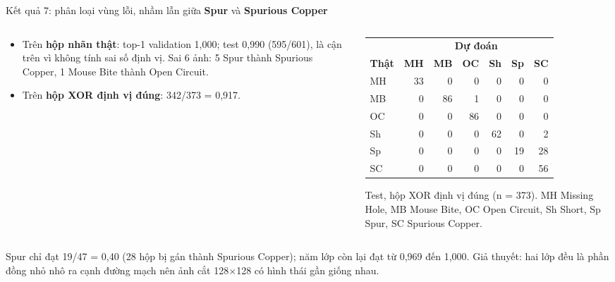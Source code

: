 \documentclass[aspectratio=169,11pt,t]{beamer}
\newcommand{\hl}[1]{{\bfseries\color{coral}#1}}
\newcommand{\hdr}[1]{{\bfseries\color{muted}#1}}
\newcommand{\mynote}[1]{{\color{muted}\footnotesize #1}}
\begin{document}
\begin{frame}{Kết quả 7: phân loại vùng lỗi, nhầm lẫn giữa \hl{Spur} và \hl{Spurious Copper}}
  \begin{columns}[T]
    \begin{column}{0.46\textwidth}
      \footnotesize
      \begin{itemize}
        \item Trên \textbf{hộp nhãn thật}: top-1 validation 1,000; test 0,990 (595/601), là cận trên vì không tính sai số định vị. Sai 6 ảnh: 5 Spur thành Spurious Copper, 1 Mouse Bite thành Open Circuit.
        \item Trên \textbf{hộp XOR định vị đúng}: 342/373 = 0,917.
      \end{itemize}
    \end{column}
    \begin{column}{0.50\textwidth}
      \centering
      \footnotesize
      \renewcommand{\arraystretch}{1.25}\setlength{\tabcolsep}{5pt}
      \begin{tabular}{@{}l rrrrrr@{}}
        & \multicolumn{6}{c}{\hdr{Dự đoán}} \\
        \hdr{Thật} & \hdr{MH} & \hdr{MB} & \hdr{OC} & \hdr{Sh} & \hdr{Sp} & \hdr{SC} \\
        \midrule
        MH & \cellcolor{teal!18}33 & {\color{hair}0} & {\color{hair}0} & {\color{hair}0} & {\color{hair}0} & {\color{hair}0} \\
        MB & {\color{hair}0} & \cellcolor{teal!18}86 & \cellcolor{danger!22}1 & {\color{hair}0} & {\color{hair}0} & {\color{hair}0} \\
        OC & {\color{hair}0} & {\color{hair}0} & \cellcolor{teal!18}86 & {\color{hair}0} & {\color{hair}0} & {\color{hair}0} \\
        Sh & {\color{hair}0} & {\color{hair}0} & {\color{hair}0} & \cellcolor{teal!18}62 & {\color{hair}0} & \cellcolor{danger!22}2 \\
        Sp & {\color{hair}0} & {\color{hair}0} & {\color{hair}0} & {\color{hair}0} & \cellcolor{amber!30}19 & \cellcolor{danger!40}28 \\
        SC & {\color{hair}0} & {\color{hair}0} & {\color{hair}0} & {\color{hair}0} & {\color{hair}0} & \cellcolor{teal!18}56 \\
      \end{tabular}
      \vspace{2pt}\par
      \mynote{Test, hộp XOR định vị đúng (n = 373). MH Missing Hole, MB Mouse Bite, OC Open Circuit, Sh Short, Sp Spur, SC Spurious Copper.}
    \end{column}
  \end{columns}
  \vspace{3pt}
  \begin{key}
    \small Spur chỉ đạt 19/47 = 0,40 (28 hộp bị gán thành Spurious Copper); năm lớp còn lại đạt từ 0,969 đến 1,000. Giả thuyết: hai lớp đều là phần đồng nhỏ nhô ra cạnh đường mạch nên ảnh cắt 128$\times$128 có hình thái gần giống nhau.
  \end{key}
\end{frame}
\end{document}
